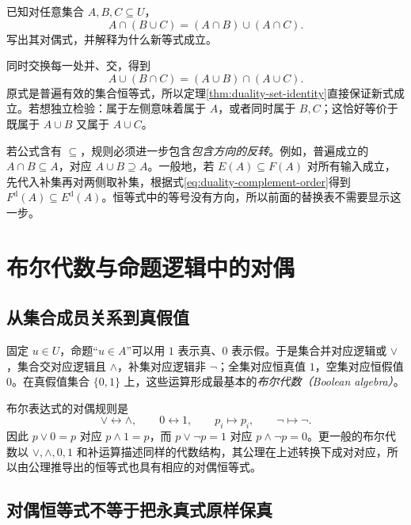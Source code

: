 \documentclass[UTF8,12pt,a4paper,fontset=fandol]{ctexart}
\begin{document}
\begin{example}[分配律的配对]
已知对任意集合 $A,B,C\subseteq U$，
\[
 A\cap(B\cup C)=(A\cap B)\cup(A\cap C).
\]
写出其对偶式，并解释为什么新等式成立。
\end{example}
\begin{solve}
同时交换每一处并、交，得到
\[
 A\cup(B\cap C)=(A\cup B)\cap(A\cup C).
\]
原式是普遍有效的集合恒等式，所以定理\ref{thm:duality-set-identity}直接保证新式成立。若想独立检验：属于左侧意味着属于 $A$，或者同时属于 $B,C$；这恰好等价于既属于 $A\cup B$ 又属于 $A\cup C$。
\end{solve}

若公式含有 $\subseteq$，规则必须进一步包含\emph{包含方向的反转}。例如，普遍成立的 $A\cap B\subseteq A$，对应 $A\cup B\supseteq A$。一般地，若 $E(A)\subseteq F(A)$ 对所有输入成立，先代入补集再对两侧取补集，根据式\eqref{eq:duality-complement-order}得到 $F^{\mathrm d}(A)\subseteq E^{\mathrm d}(A)$。恒等式中的等号没有方向，所以前面的替换表不需要显示这一步。

\section{布尔代数与命题逻辑中的对偶}
\label{sec:duality-boolean}

\subsection{从集合成员关系到真假值}

固定 $u\in U$，命题“$u\in A$”可以用 $1$ 表示真、$0$ 表示假。于是集合并对应逻辑或 $\lor$，集合交对应逻辑且 $\land$，补集对应逻辑非 $\neg$；全集对应恒真值 $1$，空集对应恒假值 $0$。在真假值集合 $\{0,1\}$ 上，这些运算形成最基本的\emph{布尔代数（Boolean algebra）}。

布尔表达式的对偶规则是
\begin{equation}
 \lor\longleftrightarrow\land,
 \qquad 0\longleftrightarrow1,
 \qquad p_i\longmapsto p_i,
 \qquad\neg\longmapsto\neg.
 \label{eq:duality-boolean-rule}
\end{equation}
因此 $p\lor0=p$ 对应 $p\land1=p$，而 $p\lor\neg p=1$ 对应 $p\land\neg p=0$。更一般的布尔代数以 $\vee,\wedge,0,1$ 和补运算描述同样的代数结构，其公理在上述转换下成对对应，所以由公理推导出的恒等式也具有相应的对偶恒等式。

\subsection{对偶恒等式不等于把永真式原样保真}
\end{document}

